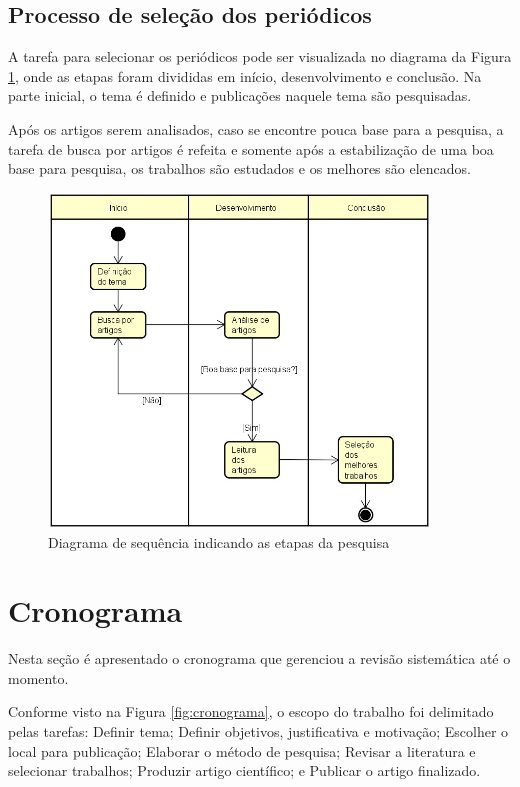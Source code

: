 \documentclass[smallextended]{svjour3}       %
\begin{document}
\subsection{Processo de seleção dos periódicos}
\label{sec:3}

A tarefa para selecionar os periódicos pode ser visualizada no diagrama da Figura \ref{fig:diagrama}, onde as etapas foram divididas em início, desenvolvimento e conclusão. Na parte inicial, o tema é definido e publicações naquele tema são pesquisadas. 

Após os artigos serem analisados, caso se encontre pouca base para a pesquisa, a tarefa de busca por artigos é refeita e somente após a estabilização de uma boa base para pesquisa, os trabalhos são estudados e os melhores são elencados.

\begin{figure}[!ht]
	\centering
	\includegraphics[width=0.9\textwidth]{imagens/diagrama.jpg}
	\caption{Diagrama de sequência indicando as etapas da pesquisa}
	\label{fig:diagrama}
\end{figure}

\section{Cronograma}
\label{sec:4}

Nesta seção é apresentado o cronograma que gerenciou a revisão sistemática até o momento. 

Conforme visto na Figura \ref{fig:cronograma}, o escopo do trabalho foi delimitado pelas tarefas: Definir tema; Definir objetivos, justificativa e motivação; Escolher o local para publicação; Elaborar o método de pesquisa; Revisar a literatura e selecionar trabalhos; Produzir artigo científico; e Publicar o artigo finalizado. 
\end{document}
